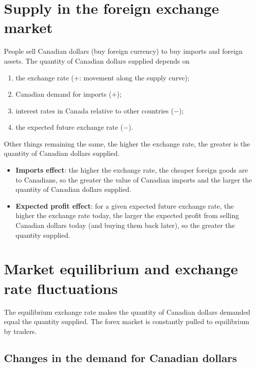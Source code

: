 \section{Supply in the foreign exchange market}

People sell Canadian dollars (buy foreign currency) to buy imports and foreign assets.
The quantity of Canadian dollars supplied depends on
\begin{enumerate}
  \item the exchange rate ($+$: movement along the supply curve);
  \item Canadian demand for imports ($+$);
  \item interest rates in Canada relative to other countries ($-$);
  \item the expected future exchange rate ($-$).
\end{enumerate}

\begin{important}
Other things remaining the same, the higher the exchange rate, the greater is the
quantity of Canadian dollars supplied.
\end{important}

\begin{itemize}
  \item \textbf{Imports effect}: the higher the exchange rate, the cheaper foreign goods
        are to Canadians, so the greater the value of Canadian imports and the larger the
        quantity of Canadian dollars supplied.
  \item \textbf{Expected profit effect}: for a given expected future exchange rate, the
        higher the exchange rate today, the larger the expected profit from selling
        Canadian dollars today (and buying them back later), so the greater the quantity
        supplied.
\end{itemize}

\section{Market equilibrium and exchange rate fluctuations}

The equilibrium exchange rate makes the quantity of Canadian dollars demanded equal the
quantity supplied. The forex market is constantly pulled to equilibrium by traders.

\subsection{Changes in the demand for Canadian dollars}

